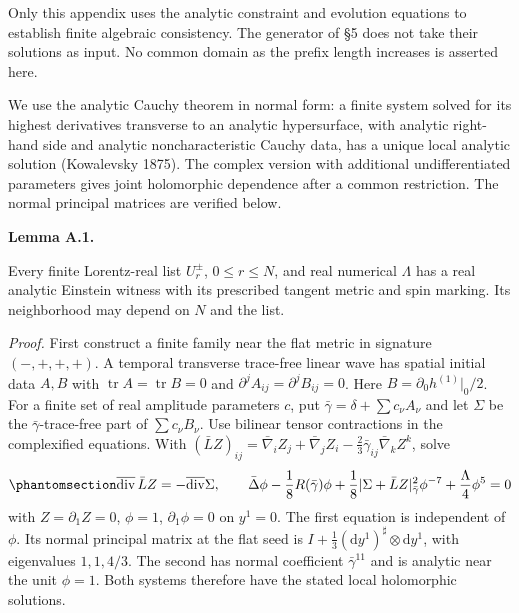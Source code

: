 \documentclass[
  english,
  11pt,
  reqno]{amsart}
\makeatletter
\newcommand{\pandocstatementheading}[1]{%
  \par\addpenalty{\@beginparpenalty}%
  \addvspace{.5\baselineskip plus .2\baselineskip minus .2\baselineskip}%
  {\normalfont\bfseries #1\par}%
  \nobreak\@afterindenttrue\@afterheading
}
\makeatother
\begin{document}
Only this appendix uses the analytic constraint and evolution equations
to establish finite algebraic consistency. The generator of §5 does not
take their solutions as input. No common domain as the prefix length
increases is asserted here.

We use the analytic Cauchy theorem in normal form: a finite system
solved for its highest derivatives transverse to an analytic
hypersurface, with analytic right-hand side and analytic
noncharacteristic Cauchy data, has a unique local analytic solution
(Kowalevsky 1875). The complex version with additional undifferentiated
parameters gives joint holomorphic dependence after a common
restriction. The normal principal matrices are verified below.

\pandocstatementheading{\protect{}\label{lem:gg-finite-witness}Lemma A.1.}

Every finite Lorentz-real list \(U_r^\pm\), \(0\le r\le N\), and real
numerical \(\Lambda\) has a real analytic Einstein witness with its
prescribed tangent metric and spin marking. Its neighborhood may depend
on \(N\) and the list.

\emph{Proof.} First construct a finite family near the flat metric in
signature \((-,+,+,+)\). A temporal transverse trace-free linear wave
has spatial initial data \(A,B\) with
\(\operatorname{tr}A=\operatorname{tr}B=0\) and
\(\partial^jA_{ij}=\partial^jB_{ij}=0\). Here
\(B=\partial_0h^{(1)}|_0/2\). For a finite set of real amplitude
parameters \(c\), put \(\bar\gamma=\delta+\sum c_\nu A_\nu\) and let
\(\Sigma\) be the \(\bar\gamma\)-trace-free part of
\(\sum c_\nu B_\nu\). Use bilinear tensor contractions in the
complexified equations. With
\((\bar LZ)_{ij}=\bar\nabla_iZ_j+\bar\nabla_jZ_i
-\frac23\bar\gamma_{ij}\bar\nabla_kZ^k\), solve
\begin{equation}\protect\phantomsection\label{eq:gg-finite-constraint-solve}{
 \overline{\operatorname{div}}\,\bar LZ
       =-\overline{\operatorname{div}}\Sigma,\qquad
 \bar\Delta\phi-\frac18R(\bar\gamma)\phi
       +\frac18|\Sigma+\bar LZ|_{\bar\gamma}^2\phi^{-7}
       +\frac{\Lambda}{4}\phi^5=0
}\end{equation} with \(Z=\partial_1Z=0\), \(\phi=1\),
\(\partial_1\phi=0\) on \(y^1=0\). The first equation is independent of
\(\phi\). Its normal principal matrix at the flat seed is
\(I+\frac13(\mathrm dy^1)^\sharp\otimes\mathrm dy^1\), with eigenvalues
\(1,1,4/3\). The second has normal coefficient \(\bar\gamma^{11}\) and
is analytic near the unit \(\phi=1\). Both systems therefore have the
stated local holomorphic solutions.
\end{document}
